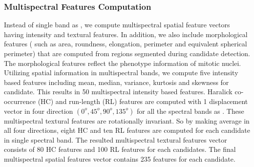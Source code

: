 \documentclass[10pt,twocolumn,letterpaper]{article}
\begin{document}
\subsubsection{Multispectral Features Computation}
Instead of single band as \cite{boucheron2007, masood2009, wu2009, wu2012}, we compute multispectral spatial feature vectors having intensity and textural features. In addition, we also include morphological features ( such as area, roundness, elongation, perimeter and equivalent spherical perimeter) that are computed from regions segmented during candidate detection. The morphological features reflect the phenotype information of mitotic nuclei. Utilizing spatial information in multispectral bands, we compute five intensity based features including mean, median, variance, kurtosis and skewness for candidate. This results in 50 multispectral intensity based features. Haralick co-occurrence (HC) \cite{haralick1973} and run-length (RL) \cite{galloway1975} features are computed with 1 displacement vector in four direction $(0^o, 45^o, 90^o, 135^o)$ for all the spectral bands as \cite{irshad2013b}. These multispectral textural features are rotationally invariant. So by making average in all four directions, eight HC and ten RL features are computed for each candidate in single spectral band. The resulted multispectral textural features vector consists of 80 HC features and 100 RL features for each candidates. The final multispectral spatial features vector contains 235 features for each candidate. 
\end{document}
